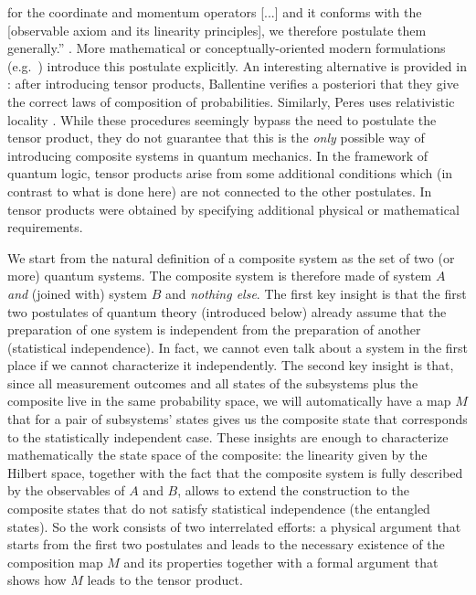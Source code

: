 \documentclass[aps,prl,amsmath,amssymb,twocolumn]{revtex4}
\theoremstyle{plain}
\theoremstyle{definition}
\theoremstyle{remark}
\def\comment#1{}
\begin{document}
	for the coordinate and momentum operators [...]  and it conforms with
	the [observable axiom and its linearity principles], we therefore
	postulate them generally.''  \cite{vonneumannbook}.  More mathematical
	or conceptually-oriented modern formulations
	(e.g.~\cite{ozawa,masanes,wootters,nielsenchuang}) introduce this
	postulate explicitly.  An interesting alternative is provided in
	\cite{ballentinebook,ballentinepaper}: after introducing tensor
	products, Ballentine verifies a posteriori that they give the correct
	laws of composition of probabilities. Similarly, Peres uses
	relativistic locality \cite{peres}. While these procedures seemingly
	bypass the need to postulate the tensor product, they do not guarantee
	that this is the {\em only} possible way of introducing composite
	systems in quantum mechanics. In the framework of quantum logic,
	tensor products arise from some additional conditions \cite{matolcsi}
	which (in contrast to what is done here) are not connected to the
	other postulates.  In \cite{marmo,aerts} tensor products were obtained
	by specifying additional physical or mathematical requirements.
	\comment{ {\em Il resto della frase da spostare in supp material} In
		quantum field theory one tends to avoid problems connected with
		tensor products of infinite dimensional spaces by focusing on
		algebraic commutation structures, e.g.~\cite{giddins,roos}.  In
		particular, the recent MIP*=RE result \cite{mipre} implies that, in
		infinite dimensions, the tensor product is strictly less
		computationally powerful than the commutation structures,
		emphasizing the difference among these two structures, at least for
		the infinite-dimensional case. We will consider the non-relativistic
		setting here.}
	
	We start from the natural definition of a composite system as the set
	of two (or more) quantum systems. The composite system is therefore
	made of system $A$ {\em and} (joined with) system $B$ and {\em nothing
		else}. The first key insight is that the first two postulates of
	quantum theory (introduced below) already assume that the preparation
	of one system is independent from the preparation of another
	(statistical independence). In fact, we cannot even talk about a
	system in the first place if we cannot characterize it independently.
	The second key insight is that, since all measurement outcomes and all
	states of the subsystems plus the composite live in the same
	probability space, we will automatically have a map $M$ that for a
	pair of subsystems' states gives us the composite state that
	corresponds to the statistically independent case. These insights are
	enough to characterize mathematically the state space of the
	composite: the linearity given by the Hilbert space, together with the
	fact that the composite system is fully described by the observables
	of $A$ and $B$, allows to extend the construction to the composite
	states that do not satisfy statistical independence (the entangled
	states). So the work consists of two interrelated efforts: a physical
	argument that starts from the first two postulates and leads to the
	necessary existence of the composition map $M$ and its properties
	together with a formal argument that shows how $M$ leads to the tensor
	product.
	
\end{document}
